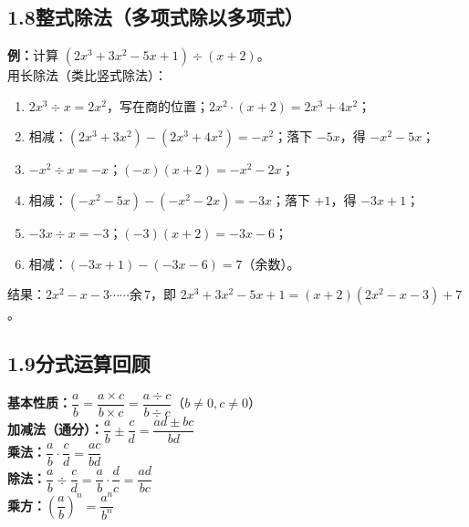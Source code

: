 \documentclass[12pt, a4paper]{ctexart}
\begin{document}
\subsection*{1.8\quad 整式除法（多项式除以多项式）}

\begin{knowledgebox}
\textbf{例：}\quad 计算 $(2x^3 + 3x^2 - 5x + 1) \div (x + 2)$。\\[6pt]
用长除法（类比竖式除法）：\\[3pt]
\begin{enumerate}[leftmargin=18pt]
\item $2x^3 \div x = 2x^2$，写在商的位置；\quad $2x^2 \cdot (x+2) = 2x^3 + 4x^2$；
\item 相减：$(2x^3+3x^2) - (2x^3+4x^2) = -x^2$；落下 $-5x$，得 $-x^2-5x$；
\item $-x^2 \div x = -x$；\quad $(-x)(x+2) = -x^2-2x$；
\item 相减：$(-x^2-5x)-(-x^2-2x) = -3x$；落下 $+1$，得 $-3x+1$；
\item $-3x \div x = -3$；\quad $(-3)(x+2) = -3x-6$；
\item 相减：$(-3x+1)-(-3x-6) = 7$（余数）。
\end{enumerate}
结果：$2x^2 - x - 3 \cdots\cdots 余\, 7$，即 $2x^3+3x^2-5x+1 = (x+2)(2x^2-x-3) + 7$。
\end{knowledgebox}

\subsection*{1.9\quad 分式运算回顾}

\begin{knowledgebox}[分式的基本性质与运算]
\textbf{基本性质：}\quad $\dfrac{a}{b} = \dfrac{a \times c}{b \times c} = \dfrac{a \div c}{b \div c}$\quad（$b \neq 0, c \neq 0$）\\[8pt]
\textbf{加减法（通分）：}\quad $\dfrac{a}{b} \pm \dfrac{c}{d} = \dfrac{ad \pm bc}{bd}$\\[8pt]
\textbf{乘法：}\quad $\dfrac{a}{b} \cdot \dfrac{c}{d} = \dfrac{ac}{bd}$\\[8pt]
\textbf{除法：}\quad $\dfrac{a}{b} \div \dfrac{c}{d} = \dfrac{a}{b} \cdot \dfrac{d}{c} = \dfrac{ad}{bc}$\\[8pt]
\textbf{乘方：}\quad $\left(\dfrac{a}{b}\right)^n = \dfrac{a^n}{b^n}$
\end{knowledgebox}
\end{document}
